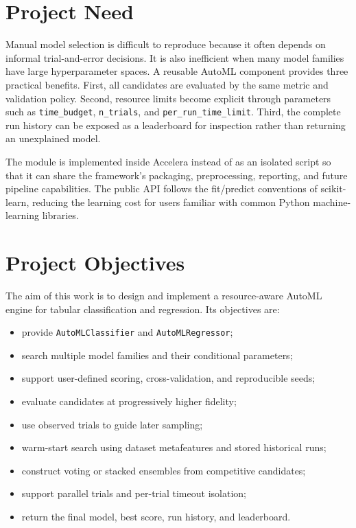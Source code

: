 \documentclass[12pt,a4paper,oneside]{report}
\begin{document}
\section{Project Need}

Manual model selection is difficult to reproduce because it often depends on
informal trial-and-error decisions. It is also inefficient when many model
families have large hyperparameter spaces. A reusable AutoML component provides
three practical benefits. First, all candidates are evaluated by the same
metric and validation policy. Second, resource limits become explicit through
parameters such as \texttt{time\_budget}, \texttt{n\_trials}, and
\texttt{per\_run\_time\_limit}. Third, the complete run history can be exposed
as a leaderboard for inspection rather than returning an unexplained model.

\medskip
\noindent The module is implemented inside Accelera instead of as an isolated script so
that it can share the framework's packaging, preprocessing, reporting, and
future pipeline capabilities. The public API follows the fit/predict conventions
of scikit-learn, reducing the learning cost for users familiar with common
Python machine-learning libraries.

\section{Project Objectives}

The aim of this work is to design and implement a resource-aware AutoML engine
for tabular classification and regression. Its objectives are:

\begin{itemize}[leftmargin=*]
  \item provide \texttt{AutoMLClassifier} and \texttt{AutoMLRegressor};
  \item search multiple model families and their conditional parameters;
  \item support user-defined scoring, cross-validation, and reproducible seeds;
  \item evaluate candidates at progressively higher fidelity;
  \item use observed trials to guide later sampling;
  \item warm-start search using dataset metafeatures and stored historical runs;
  \item construct voting or stacked ensembles from competitive candidates;
  \item support parallel trials and per-trial timeout isolation;
  \item return the final model, best score, run history, and leaderboard.
\end{itemize}
\end{document}
